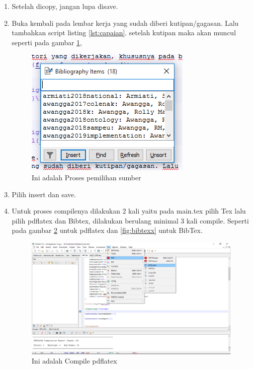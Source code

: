 \begin{enumerate}
\begin{figure}[!htbp]
\end{figure}
  \item Setelah dicopy, jangan lupa disave.
  \item Buka kembali pada lembar kerja yang sudah diberi kutipan/gagasan. Lalu tambahkan script listing \ref{lst:capaian}. setelah kutipan maka akan muncul seperti pada gambar \ref{fig:memilihsumber},

  \begin{figure}[!htbp]
  \centering
  \includegraphics[width=.75\textwidth]{figures/memilihsumber.png}
  \caption{Ini adalah Proses pemilihan sumber}\label{fig:memilihsumber}
\end{figure}
  \item Pilih insert dan save.
  \item Untuk proses compilenya dilakukan 2 kali yaitu pada main.tex pilih Tex lalu pilih pdflatex dan Bibtex, dilakukan berulang minimal 3 kali compile. Seperti pada gambar \ref{fig:pdflatex} untuk pdflatex dan \ref{fig:bibtexx} untuk BibTex.
   \begin{figure}[!htbp]
  \centering
  \includegraphics[width=.75\textwidth]{figures/pdflatex.png}
  \caption{Ini adalah Compile pdflatex}\label{fig:pdflatex}

\end{figure}
\end{enumerate}
